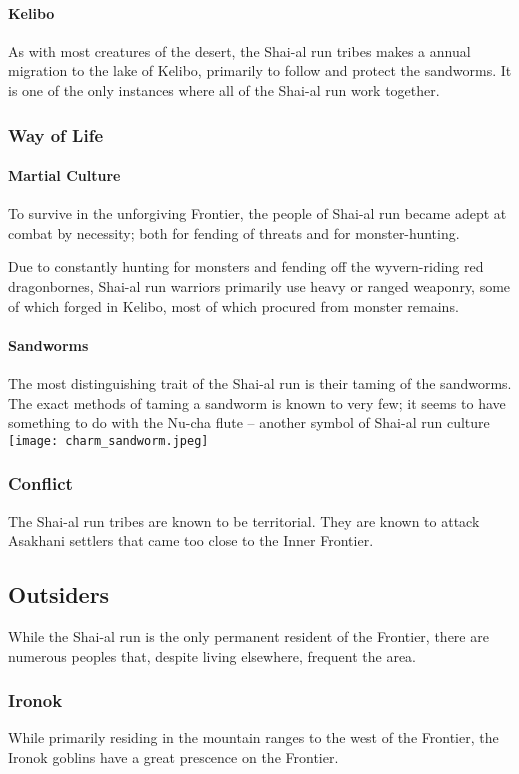 \documentclass[../main.tex]{subfiles}
\begin{document}
\paragraph{Kelibo}
As with most creatures of the desert, the Shai-al run tribes makes a
annual migration to the lake of Kelibo, primarily to follow and protect the
sandworms. It is one of the only instances where all of the Shai-al run
work together.

\subsubsection{Way of Life}
\paragraph{Martial Culture}
To survive in the unforgiving Frontier, the people of Shai-al run
became adept at combat by necessity; both for fending of threats and
for monster-hunting.

Due to constantly hunting for monsters and fending off the wyvern-riding red
dragonbornes, Shai-al run warriors primarily use heavy or ranged weaponry,
some of which forged in Kelibo, most of which procured from monster remains.
\paragraph{Sandworms}
The most distinguishing trait of the Shai-al run is their taming
of the sandworms. The exact methods of taming a sandworm is known to very few;
it seems to have something to do with the Nu-cha flute -- another
symbol of Shai-al run culture
\texttt{[image: charm\_sandworm.jpeg]}

\subsubsection{Conflict}
The Shai-al run tribes are known to be territorial. They are known to attack
Asakhani settlers that came too close to the Inner Frontier.

\subsection{Outsiders}
While the Shai-al run is the only permanent resident of the Frontier,
there are numerous peoples that, despite living elsewhere, frequent the area.

\subsubsection{Ironok}
While primarily residing in the mountain ranges to the west of the Frontier,
the Ironok goblins have a great prescence on the Frontier.
\end{document}
